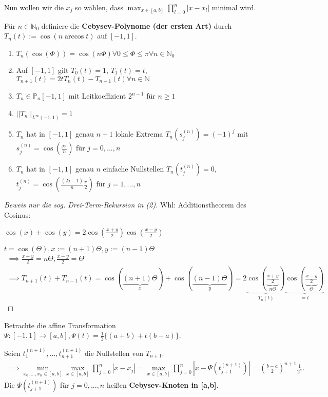 Nun wollen wir die $x_j$ so wählen, dass $\max_{x\in [a,b]} \prod_{l=0}^{n} |x-x_l|$ minimal wird.

\begin{definition}
	Für $n \in \mathbb{N}_0$ definiere die \textbf{Cebysev-Polynome (der ersten Art)} durch $T_n(t) := \cos(n \arccos t)$ auf $[-1, 1]$.
\end{definition}

\begin{lemma}
	\begin{enumerate}
		\item $T_n(\cos(\Phi)) = \cos(n \Phi) \forall 0 \leq \Phi \leq \pi \forall n \in \mathbb{N}_0$
		\item Auf $[-1, 1]$ gilt $T_0(t) = 1$, $T_1(t) = t$, $T_{n+1}(t) = 2t T_n(t) - T_{n-1}(t) \forall n \in \mathbb{N}$
		\item $T_n \in \mathbb{P}_n[-1, 1]$ mit Leitkoeffizient $2^{n-1}$ für $n \geq 1$
		\item $||T_n||_{L^\infty(-1, 1)} = 1$
		\item $T_n$ hat in $[-1, 1]$ genau $n+1$ lokale Extrema $T_n(s_j^{(n)}) = (-1)^j$ mit $s_j^{(n)} = \cos \left(\frac{j\pi}{n}\right)$ für $j=0, ..., n$
		\item $T_n$ hat in $[-1, 1]$ genau $n$ einfache Nullstellen $T_n(t_j^{(n)}) = 0$, $t_j^{(n)} = \cos \left(\frac{(2j-1)}{n}\frac{\pi}{2} \right)$ für $j=1, ..., n$
	\end{enumerate}
\end{lemma}

\begin{proof}[Beweis nur die sog. Drei-Term-Rekursion in (2)]
	Whl: Additionstheorem des Cosinus:
	
	$\cos(x)+\cos(y) = 2\cos\left(\frac{x+y}{2}\right) \cos\left(\frac{x-y}{2}\right)$
	
	$t=\cos(\Theta), x:=(n+1)\Theta, y:=(n-1)\Theta$
	\begin{align*}
		\implies \frac{x+y}{2} = n \Theta, \frac{x-y}{2} = \Theta\\
		\implies T_{n+1}(t) + T_{n-1}(t) = \cos(\underbrace{(n+1)\Theta}_{x}) + \cos(\underbrace{(n-1)\Theta}_{y}) = 2 \underbrace{\cos\left(\underbrace{\frac{x+y}{2}}_{n\Theta}\right)}_{T_n(t)} \underbrace{\cos\left(\underbrace{\frac{x-y}{2}}_{\Theta}\right)}_{=t}
	\end{align*}
\end{proof}

\begin{theorem}
	Betrachte die affine Transformation $\Psi:[-1, 1] \rightarrow [a,b], \Psi(t)=\frac{1}{2} \{(a+b) + t(b-a)\}$.
	
	Seien $t_1^{(n+1)}, ..., t_{n+1}^{(n+1)}$ die Nullstellen von $T_{n+1}$.
	\begin{align*}
		\implies \min_{x_0, ..., x_n \in [a,b]} \max_{x\in [a,b]} \prod_{j=0}^{n} |x-x_j| = \max_{x\in [a,b]} \prod_{j=0}^{n} |x - \Psi(t_{j+1}^{(n+1)})| = \left(\frac{b-a}{2}\right)^{n+1} \frac{1}{2^n}.
	\end{align*}
	Die $\Psi(t_{j+1}^{(n+1)})$ für $j=0, ..., n$ heißen \textbf{Cebysev-Knoten in [a,b]}.
\end{theorem}

